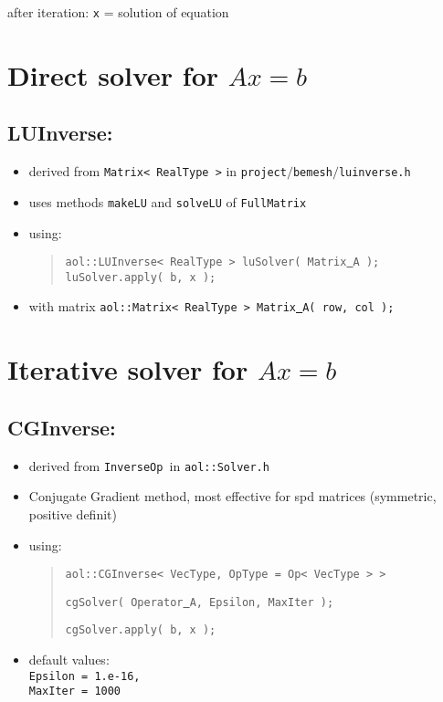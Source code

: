 after iteration: {\tt x} = solution of equation



\section {Direct solver for $Ax=b$}
\subsection{ LUInverse: }
\begin{itemize}
\item derived from {\tt Matrix< RealType >} in {\tt project$/$bemesh$/$luinverse.h}
\item uses methods {\tt makeLU} and {\tt solveLU} of {\tt FullMatrix}
\item using: \begin{quote}
{\tt aol::LUInverse< RealType > luSolver(  Matrix\underline{ }A  ); \\
luSolver.apply( b, x );} \end{quote}
\item with matrix {\tt aol::Matrix< RealType > Matrix\underline{ }A( row, col );}
\end{itemize}


\section {Iterative solver for $Ax = b$}
\label{sec:iterativeSolvers}
\subsection{ CGInverse: }
\begin{itemize}
\item derived from {\tt InverseOp }in {\tt aol::Solver.h}
\item Conjugate Gradient method, most effective for spd matrices (symmetric, positive definit)
\item using: \begin{quote}
{\tt aol::CGInverse< VecType, OpType = Op< VecType > >}
\begin{flushright} {\tt cgSolver( Operator\underline{ }A, Epsilon, MaxIter );} \end{flushright}
{\tt cgSolver.apply( b, x ); } \end{quote}
\item default values: \\
{\tt Epsilon = 1.e-16, \\ MaxIter = 1000}
\end{itemize}

